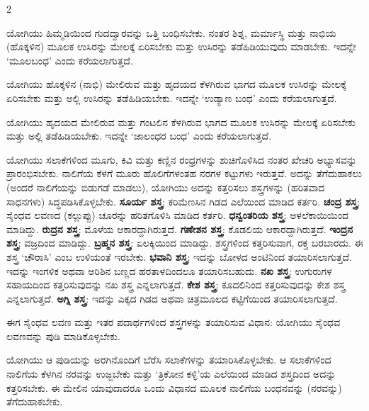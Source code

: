 \newpage

\renewcommand{\labelitemi}{$\bullet$}
\begin{multicols}{2}
\begin{kan}


ಯೋಗಿಯು ಹಿಮ್ಮಡಿಯಿಂದ ಗುದದ್ವಾರವನ್ನು ಒತ್ತಿ ಬಂಧಿಸಬೇಕು. ನಂತರ ಶಿಶ್ನ, ಮರ್ಮಾಸ್ಥಿ ಮತ್ತು ನಾಭಿಯ (ಹೊಕ್ಕಳಿನ) ಮೂಲಕ ಉಸಿರನ್ನು ಮೇಲಕ್ಕೆ ಏರಿಸಬೇಕು ಮತ್ತು ಉಸಿರನ್ನು ತಡೆಹಿಡಿಯುವುದು ಮಾಡಬೇಕು. ಇದನ್ನೇ ‘ಮೂಲಬಂಧ’ ಎಂದು ಕರೆಯಲಾಗುತ್ತದೆ.
\vskip 7pt


ಯೋಗಿಯು ಹೊಕ್ಕಳಿನ (ನಾಭಿ) ಮೇಲಿರುವ ಮತ್ತು ಹೃದಯದ ಕೆಳಗಿರುವ ಭಾಗದ ಮೂಲಕ ಉಸಿರನ್ನು ಮೇಲಕ್ಕೆ ಏರಿಸಬೇಕು ಮತ್ತು ಅಲ್ಲಿ ಉಸಿರನ್ನು ತಡೆಹಿಡಿಯಬೇಕು. ಇದನ್ನೇ ‘ಉಡ್ಯಾಣ ಬಂಧ’ ಎಂದು ಕರೆಯಲಾಗುತ್ತದೆ.
\vskip 7pt
 

ಯೋಗಿಯು ಹೃದಯದ ಮೇಲಿರುವ ಮತ್ತು ಗಂಟಲಿನ ಕೆಳಗಿರುವ ಭಾಗದ ಮೂಲಕ ಉಸಿರನ್ನು ಮೇಲಕ್ಕೆ ಏರಿಸಬೇಕು ಮತ್ತು ಅಲ್ಲಿ ತಡೆಹಿಡಿಯಬೇಕು. ಇದನ್ನೇ ‘ಜಾಲಂಧರ ಬಂಧ’ ಎಂದು ಕರೆಯಲಾಗುತ್ತದೆ.
\vskip 7pt

\vskip 7pt


ಯೋಗಿಯು ಸಲಾಕೆಗಳಿಂದ ಮೂಗು, ಕಿವಿ ಮತ್ತು ಕಣ್ಣಿನ ರಂಧ್ರಗಳನ್ನು ಶುಚಿಗೊಳಿಸಿದ ನಂತರ ಖೇಚರಿ ಅಭ್ಯಾಸವನ್ನು ಪ್ರಾರಂಭಿಸಬೇಕು. ನಾಲಿಗೆಯ ಕೆಳಗೆ ಮೂರು ಹೊಲಿಗೆಗಳಂತಹ ನರಗಳ ಕಟ್ಟುಗಳು ಇರುತ್ತವೆ. ಅದನ್ನು ತೆಗೆದುಹಾಕಲು (ಅಂದರೆ ನಾಲಿಗೆಯನ್ನು ಬಿಡುಗಡೆ ಮಾಡಲು), ಯೋಗಿಯು ಅದನ್ನು ಕತ್ತರಿಸಲು ಶಸ್ತ್ರಗಳನ್ನು (ಹರಿತವಾದ ಸಾಧನಗಳು) ಸಿದ್ಧಪಡಿಸಿಕೊಳ್ಳಬೇಕು. 
\textbf{ಸೂರ್ಯ ಶಸ್ತ್ರ}: ಕರಿಮೆಣಸಿನ ಗಿಡದ ಎಲೆಯಿಂದ ಮಾಡಿದ ಕರ್ತರಿ.
\textbf{ಚಂದ್ರ ಶಸ್ತ್ರ}: ಸೈಂಧವ ಲವಣದ (ಕಲ್ಲುಪ್ಪು) ಚೂರನ್ನು ಹರಿತಗೊಳಿಸಿ ಮಾಡಿದ ಕರ್ತರಿ.
\textbf{ಧನ್ವಂತರಿಯ ಶಸ್ತ್ರ}: ಅಳಲೆಕಾಯಿಯಿಂದ ಮಾಡಿದ್ದು.
\textbf{ರುದ್ರನ ಶಸ್ತ್ರ}: ಮೊಳೆಯ ಆಕಾರದ್ದಾಗಿರುತ್ತದೆ.
\textbf{ಗಣೇಶನ ಶಸ್ತ್ರ}: ಕೊಡಲಿಯ ಆಕಾರದ್ದಾಗಿರುತ್ತದೆ.
\textbf{ಇಂದ್ರನ ಶಸ್ತ್ರ}: ವಜ್ರದಿಂದ ಮಾಡಿದ್ದು.
\textbf{ಬ್ರಹ್ಮನ ಶಸ್ತ್ರ}: ಏಲಕ್ಕಿಯಿಂದ ಮಾಡಿದ್ದು.
ಶಸ್ತ್ರಗಳಿಂದ ಕತ್ತರಿಸುವಾಗ, ರಕ್ತ ಬರಬಾರದು. ಈ ಶಸ್ತ್ರ ‘ಚೌರಾಸಿ’ ಎಂಬ ಉಳಿಯಂತೆ ಇರಬೇಕು.
\textbf{ಭವಾನಿ ಶಸ್ತ್ರ}: ಇದನ್ನು ಬೋಳದ ಅಂಟಿನಿಂದ ತಯಾರಿಸಲಾಗುತ್ತದೆ. ಇದನ್ನು ಇಂಗಳಿಕ ಅಥವಾ ಅರಿಶಿನ ಬಣ್ಣದ ಹರತಾಳದಿಂದಲೂ ತಯಾರಿಸಬಹುದು.
\textbf{ನಖ ಶಸ್ತ್ರ}: ಉಗುರುಗಳ ಸಹಾಯದಿಂದ ಕತ್ತರಿಸುವುದನ್ನು ನಖ ಶಸ್ತ್ರ ಎನ್ನಲಾಗುತ್ತದೆ.
\textbf{ಕೇಶ ಶಸ್ತ್ರ}: ಕೂದಲಿನಿಂದ ಕತ್ತರಿಸುವುದನ್ನು ಕೇಶ ಶಸ್ತ್ರ ಎನ್ನಲಾಗುತ್ತದೆ.
\textbf{ಅಗ್ನಿ ಶಸ್ತ್ರ}: ಇದನ್ನು ಎಕ್ಕದ ಗಿಡದ ಅಥವಾ ಚಿತ್ರಮೂಲದ ಕಟ್ಟಿಗೆಯಿಂದ ತಯಾರಿಸಲಾಗುತ್ತದೆ.

ಈಗ ಸೈಂಧವ ಲವಣ ಮತ್ತು ಇತರ ಪದಾರ್ಥಗಳಿಂದ ಶಸ್ತ್ರಗಳನ್ನು ತಯಾರಿಸುವ ವಿಧಾನ: ಯೋಗಿಯು ಸೈಂಧವ ಲವಣವನ್ನು ಪುಡಿ ಮಾಡಿಕೊಳ್ಳಬೇಕು.

ಯೋಗಿಯು ಆ ಪುಡಿಯನ್ನು ಅರಗಿನೊಂದಿಗೆ ಬೆರೆಸಿ ಸಲಾಕೆಗಳನ್ನು ತಯಾರಿಸಿಕೊಳ್ಳಬೇಕು. ಆ ಸಲಾಕೆಗಳಿಂದ ನಾಲಿಗೆಯ ಕೆಳಗಿನ ನರವನ್ನು ಉಜ್ಜಬೇಕು ಮತ್ತು ‘ತ್ರಿಕೋನ ಕಳ್ಳಿ’ಯ ಎಲೆಯಿಂದ ಮಾಡಿದ ಶಸ್ತ್ರದಿಂದ ಅದನ್ನು ಕತ್ತರಿಸಬೇಕು. ಈ ಮೇಲಿನ ಯಾವುದಾದರೂ ಒಂದು ವಿಧಾನದ ಮೂಲಕ ನಾಲಿಗೆಯ ಬಂಧನವನ್ನು (ನರವನ್ನು) ತೆಗೆದುಹಾಕಬೇಕು.
\vskip 7pt


\end{kan}
\end{multicols}
